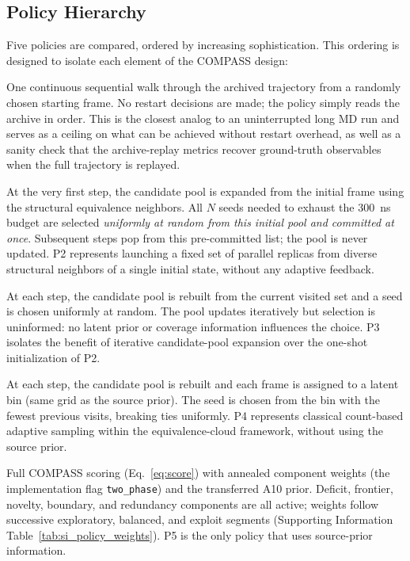 \subsection{Policy Hierarchy}
\label{sec:methods_policies}

Five policies are compared, ordered by increasing sophistication.
This ordering is designed to isolate each element of the COMPASS design:

\begin{description}[leftmargin=1.5em, labelindent=0pt, itemsep=0.4ex]
    \item[\textbf{P1 -- Single Walk.}]
    One continuous sequential walk through the archived trajectory from a randomly chosen starting frame.
    No restart decisions are made; the policy simply reads the archive in order.
    This is the closest analog to an uninterrupted long MD run and serves as a ceiling on what can be achieved without restart overhead, as well as a sanity check that the archive-replay metrics recover ground-truth observables when the full trajectory is replayed.

    \item[\textbf{P2 -- Independent Replicas.}]
    At the very first step, the candidate pool is expanded from the initial frame using the structural equivalence neighbors.
    All $N$ seeds needed to exhaust the 300~ns budget are selected \emph{uniformly at random from this initial pool and committed at once}.
    Subsequent steps pop from this pre-committed list; the pool is never updated.
    P2 represents launching a fixed set of parallel replicas from diverse structural neighbors of a single initial state, without any adaptive feedback.

    \item[\textbf{P3 -- Uniform Random.}]
    At each step, the candidate pool is rebuilt from the current visited set and a seed is chosen uniformly at random.
    The pool updates iteratively but selection is uninformed: no latent prior or coverage information influences the choice.
    P3 isolates the benefit of iterative candidate-pool expansion over the one-shot initialization of P2.

    \item[\textbf{P4 -- Min-Count Adaptive.}]
    At each step, the candidate pool is rebuilt and each frame is assigned to a latent bin (same grid as the source prior).
    The seed is chosen from the bin with the fewest previous visits, breaking ties uniformly.
    P4 represents classical count-based adaptive sampling\cite{zimmerman2015fast} within the equivalence-cloud framework, without using the source prior.

    \item[\textbf{P5 -- COMPASS.}]
    Full COMPASS scoring (Eq.~\ref{eq:score}) with annealed component weights (the implementation flag \texttt{two\_phase}) and the transferred A10 prior.
    Deficit, frontier, novelty, boundary, and redundancy components are all active; weights follow successive exploratory, balanced, and exploit segments (Supporting Information Table~\ref{tab:si_policy_weights}).
    P5 is the only policy that uses source-prior information.
\end{description}

